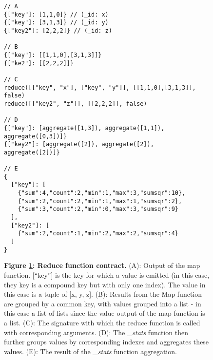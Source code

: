 \begin{figure}[H]
    \begin{verbatim}
// A
{["key"]: [1,1,0]} // (_id: x)
{["key"]: [3,1,3]} // (_id: y)
{["key2"]: [2,2,2]} // (_id: z)

// B
{["key"]: [[1,1,0],[3,1,3]]}
{["ke2"]: [[2,2,2]]}

// C
reduce([["key", "x"], ["key", "y"]], [[1,1,0],[3,1,3]], false)
reduce([["key2", "z"]], [[2,2,2]], false)

// D
{["key"]: [aggregate([1,3]), aggregate([1,1]),  aggregate([0,3])]}
{["key2"]: [aggregate([2]), aggregate([2]),  aggregate([2])]}

// E
{
  ["key"]: [
    {"sum":4,"count":2,"min":1,"max":3,"sumsqr":10},
    {"sum":2,"count":2,"min":1,"max":1,"sumsqr":2},
    {"sum":3,"count":2,"min":0,"max":3,"sumsqr":9}
  ],
  ["key2"]: [
    {"sum":2,"count":1,"min":2,"max":2,"sumsqr":4}
  ]
}
    \end{verbatim}
    \caption[\textit{\_stats} function contract]{\textbf{Figure \ref{stats-reduce-fn}: Reduce function contract.} (A): Output of the map function. [``key''] is the key for which a value is emitted (in this case, they key is a compound key but with only one index). The value in this case is a tuple of [x, y, z]. (B): Results from the Map function are grouped by a common key, with values grouped into a list - in this case a list of lists since the value output of the map function is a list. (C): The signature with which the reduce function is called with corresponding arguments. (D): The \textit{\_stats} function then further groups values by corresponding indexes and aggregates these values. (E): The result of the \textit{\_stats} function aggregation.}
    \label{stats-reduce-fn}
\end{figure}